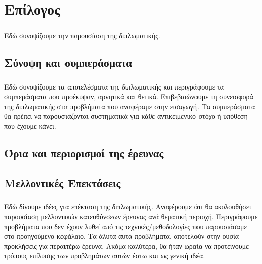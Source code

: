 \documentclass[12pt]{article}
\begin{document}

\clearpage
\section{Επίλογος}
\subparagraph{}
Εδώ συνοψίζουμε την παρουσίαση της διπλωματικής.

\subsection{Σύνοψη και συμπεράσματα}
\subparagraph{}

Εδώ συνοψίζουμε τα αποτελέσματα της διπλωματικής και περιγράφουμε τα συμπεράσματα που προέκυψαν, αρνητικά και θετικά. Επιβεβαιώνουμε τη συνεισφορά της διπλωματικής στα προβλήματα που αναφέραμε στην εισαγωγή. Τα συμπεράσματα θα πρέπει να παρουσιάζονται συστηματικά για κάθε αντικειμενικό στόχο ή υπόθεση που έχουμε κάνει.

\subsection{Όρια και περιορισμοί της έρευνας}
\subsection{Μελλοντικές Επεκτάσεις}
\subparagraph{}
Εδώ δίνουμε ιδέες για επέκταση της διπλωματικής. Αναφέρουμε ότι θα ακολουθήσει παρουσίαση μελλοντικών κατευθύνσεων έρευνας ανά θεματική περιοχή. Περιγράφουμε προβλήματα που δεν έχουν λυθεί από τις τεχνικές/μεθοδολογίες που παρουσιάσαμε στο προηγούμενο κεφάλαιο. Τα άλυτα αυτά προβλήματα, αποτελούν στην ουσία προκλήσεις για περαιτέρω έρευνα. Ακόμα καλύτερα, θα ήταν ωραία να προτείνουμε τρόπους επίλυσης των προβλημάτων αυτών έστω και ως γενική ιδέα.

\clearpage
{}

 
 
\end{document}
